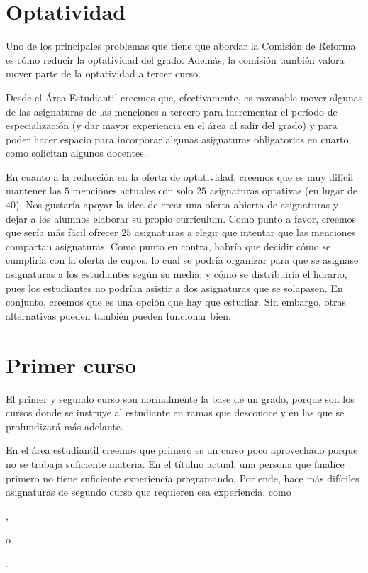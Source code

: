 \section{Optatividad}

Uno de los principales problemas que tiene que abordar
la Comisión de Reforma
es cómo reducir la optatividad del grado. %
Además, la comisión también valora mover parte de la optatividad a tercer curso.

Desde el Área Estudiantil creemos que, efectivamente,
es razonable mover algunas de las asignaturas de las menciones a tercero para
incrementar el período de especialización
(y dar mayor experiencia en el área al salir del grado)
y para poder hacer espacio para
incorporar algunas asignaturas obligatorias en cuarto,
como solicitan algunos docentes.

En cuanto a la reducción en la oferta de optatividad,
creemos que es muy difícil mantener las $5$ menciones actuales
con solo $25$ asignaturas optativas (en lugar de $40$).
Nos gustaría apoyar la idea de crear una oferta abierta de asignaturas
y dejar a los alumnos elaborar su propio currículum.
Como punto a favor, creemos que
sería más fácil ofrecer $25$ asignaturas a elegir
que intentar que las menciones compartan asignaturas.
Como punto en contra, habría que decidir
cómo se cumpliría con la oferta de cupos,
lo cual se podría organizar para que
se asignase asignaturas a los estudiantes según su media;
y cómo se distribuiría el horario,
pues los estudiantes no podrían asistir a dos asignaturas que se solapasen.
En conjunto, creemos que es una opción que hay que estudiar.
Sin embargo, otras alternativas pueden también pueden funcionar bien.

\section{Primer curso}

El primer y segundo curso son normalmente la base de un grado,
porque son los cursos donde se instruye al estudiante en ramas que desconoce y
en las que se profundizará más adelante.

En el área estudiantil creemos que primero es un curso poco aprovechado
porque no se trabaja suficiente materia.
En el títulno actual, una persona que finalice primero
no tiene suficiente experiencia programando.
Por ende, hace más difíciles asignaturas de segundo curso
que requieren esa experiencia, como
\subject{Algoritmos y Estructuras de Datos},
\subject{Programación Orientada a Objetos} o
\subject{Programación Concurrente y Distribuida}.

